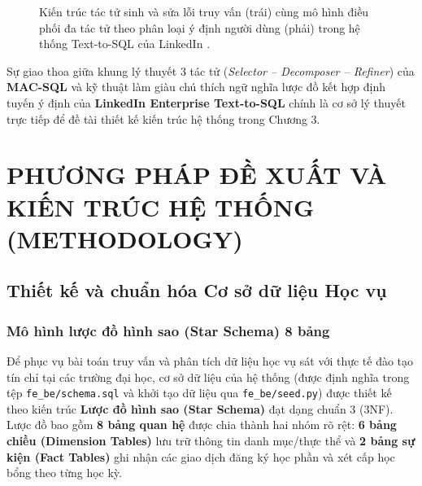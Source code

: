 \documentclass[12pt,a4paper]{report}
\begin{document}
\begin{figure}[H]
{
    }
    \caption{Kiến trúc tác tử sinh và sửa lỗi truy vấn (trái) cùng mô hình điều phối đa tác tử theo phân loại ý định người dùng (phải) trong hệ thống Text-to-SQL của LinkedIn \cite{chen2025enterprise}.}
    \label{fig:linkedin_architecture}
\end{figure}

Sự giao thoa giữa khung lý thuyết 3 tác tử (\textit{Selector -- Decomposer -- Refiner}) của \textbf{MAC-SQL} \cite{wang2025macsql} và kỹ thuật làm giàu chú thích ngữ nghĩa lược đồ kết hợp định tuyến ý định của \textbf{LinkedIn Enterprise Text-to-SQL} \cite{chen2025enterprise} chính là cơ sở lý thuyết trực tiếp để đề tài thiết kế kiến trúc hệ thống trong Chương 3.


\chapter{PHƯƠNG PHÁP ĐỀ XUẤT VÀ KIẾN TRÚC HỆ THỐNG (METHODOLOGY)}

\section{Thiết kế và chuẩn hóa Cơ sở dữ liệu Học vụ}

\subsection{Mô hình lược đồ hình sao (Star Schema) 8 bảng}

Để phục vụ bài toán truy vấn và phân tích dữ liệu học vụ sát với thực tế đào tạo tín chỉ tại các trường đại học, cơ sở dữ liệu của hệ thống (được định nghĩa trong tệp \texttt{fe\_be/schema.sql} và khởi tạo dữ liệu qua \texttt{fe\_be/seed.py}) được thiết kế theo kiến trúc \textbf{Lược đồ hình sao (Star Schema)} đạt dạng chuẩn 3 (3NF). Lược đồ bao gồm \textbf{8 bảng quan hệ} được chia thành hai nhóm rõ rệt: \textbf{6 bảng chiều (Dimension Tables)} lưu trữ thông tin danh mục/thực thể và \textbf{2 bảng sự kiện (Fact Tables)} ghi nhận các giao dịch đăng ký học phần và xét cấp học bổng theo từng học kỳ.
\end{document}
